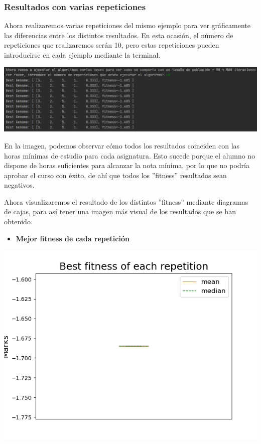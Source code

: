 \documentclass[11pt, a4paper, titlepage]{article}
\begin{document}
\subsubsection{Resultados con varias repeticiones}
Ahora realizaremos varias repeticiones del mismo ejemplo para ver gráficamente las diferencias entre los distintos resultados. En esta ocasión, el número de repeticiones que realizaremos serán 10, pero estas repeticiones pueden introducirse en cada ejemplo mediante la terminal.

\vspace{5mm}

\includegraphics[scale=0.6]{img/Res2_horas_insuf.png}

\vspace{5mm}

En la imagen, podemos observar cómo todos los resultados coinciden con las horas mínimas de estudio para cada asignatura. Esto sucede porque el alumno no dispone de horas suficientes para alcanzar la nota mínima, por lo que no podría aprobar el curso con éxito, de ahí que todos los ''fitness'' resultados sean negativos.

\vspace{5mm}

Ahora visualizaremos el resultado de los distintos ''fitness'' mediante diagramas de cajas, para así tener una imagen más visual de los resultados que se han obtenido.

\vspace{5mm}

\begin{itemize}
\item \textbf{Mejor fitness de cada repetición}
\end{itemize}

\includegraphics[scale=0.6]{img/grafica1_horinsuf}
\end{document}
